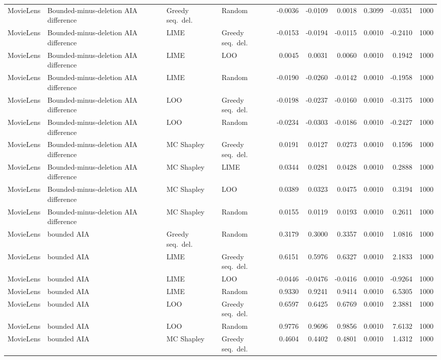 \begin{longtable}{@{}p{}p{}p{}p{}rrrrrr@{}}
MovieLens & Bounded-minus-deletion AIA difference & Greedy seq.\ del. & Random & -0.0036 & -0.0109 & 0.0018 & 0.3099 & -0.0351 & 1000 \\
MovieLens & Bounded-minus-deletion AIA difference & LIME & Greedy seq.\ del. & -0.0153 & -0.0194 & -0.0115 & 0.0010 & -0.2410 & 1000 \\
MovieLens & Bounded-minus-deletion AIA difference & LIME & LOO & 0.0045 & 0.0031 & 0.0060 & 0.0010 & 0.1942 & 1000 \\
MovieLens & Bounded-minus-deletion AIA difference & LIME & Random & -0.0190 & -0.0260 & -0.0142 & 0.0010 & -0.1958 & 1000 \\
MovieLens & Bounded-minus-deletion AIA difference & LOO & Greedy seq.\ del. & -0.0198 & -0.0237 & -0.0160 & 0.0010 & -0.3175 & 1000 \\
MovieLens & Bounded-minus-deletion AIA difference & LOO & Random & -0.0234 & -0.0303 & -0.0186 & 0.0010 & -0.2427 & 1000 \\
MovieLens & Bounded-minus-deletion AIA difference & MC Shapley & Greedy seq.\ del. & 0.0191 & 0.0127 & 0.0273 & 0.0010 & 0.1596 & 1000 \\
MovieLens & Bounded-minus-deletion AIA difference & MC Shapley & LIME & 0.0344 & 0.0281 & 0.0428 & 0.0010 & 0.2888 & 1000 \\
MovieLens & Bounded-minus-deletion AIA difference & MC Shapley & LOO & 0.0389 & 0.0323 & 0.0475 & 0.0010 & 0.3194 & 1000 \\
MovieLens & Bounded-minus-deletion AIA difference & MC Shapley & Random & 0.0155 & 0.0119 & 0.0193 & 0.0010 & 0.2611 & 1000 \\
MovieLens & bounded AIA & Greedy seq.\ del. & Random & 0.3179 & 0.3000 & 0.3357 & 0.0010 & 1.0816 & 1000 \\
MovieLens & bounded AIA & LIME & Greedy seq.\ del. & 0.6151 & 0.5976 & 0.6327 & 0.0010 & 2.1833 & 1000 \\
MovieLens & bounded AIA & LIME & LOO & -0.0446 & -0.0476 & -0.0416 & 0.0010 & -0.9264 & 1000 \\
MovieLens & bounded AIA & LIME & Random & 0.9330 & 0.9241 & 0.9414 & 0.0010 & 6.5305 & 1000 \\
MovieLens & bounded AIA & LOO & Greedy seq.\ del. & 0.6597 & 0.6425 & 0.6769 & 0.0010 & 2.3881 & 1000 \\
MovieLens & bounded AIA & LOO & Random & 0.9776 & 0.9696 & 0.9856 & 0.0010 & 7.6132 & 1000 \\
MovieLens & bounded AIA & MC Shapley & Greedy seq.\ del. & 0.4604 & 0.4402 & 0.4801 & 0.0010 & 1.4312 & 1000 \\

\end{longtable}
